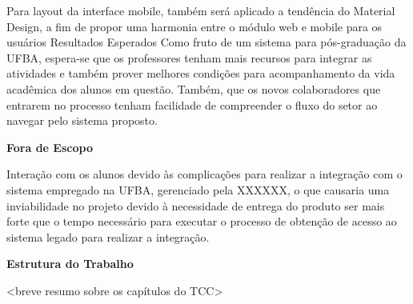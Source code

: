Para layout da interface mobile, também será aplicado a tendência do Material Design, a fim de propor uma harmonia entre o módulo web e mobile para os usuários
Resultados Esperados
Como fruto de um sistema para pós-graduação da UFBA, espera-se que os professores tenham mais recursos para integrar as atividades e também prover melhores condições para acompanhamento da vida acadêmica dos alunos em questão. Também, que os novos colaboradores que entrarem no processo tenham facilidade de compreender o fluxo do setor ao navegar pelo sistema proposto.

\textbf{Fora de Escopo}

Interação com os alunos devido às complicações para realizar a integração com o sistema empregado na UFBA, gerenciado pela XXXXXX, o que causaria uma inviabilidade no projeto devido à necessidade de entrega do produto ser mais forte que o tempo necessário para executar o processo de obtenção de acesso ao sistema legado para realizar a integração.

\textbf{Estrutura do Trabalho}

<breve resumo sobre os capítulos do TCC>